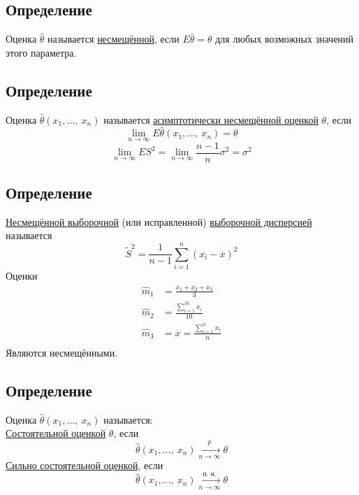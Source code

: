 \documentclass[12pt, a4paper]{article}
\newcommand{\sion}{\sum\limits_{i = 1}^{n}}
\begin{document}
\subsection*{Определение}
Оценка $\hat{\theta}$ называется \underline{несмещённой}, если $E\hat{\theta} = \theta$ для любых возможных значений этого параметра.
\subsection*{Определение}
Оценка $\hat{\theta}(x_1,\dots,\ x_n)$ называется \underline{асимптотически несмещённой оценкой} $\theta$, если
\[\lim_{n\to\infty} E\hat{\theta}(x_1,\dots,\ x_n) = \theta\]
\[\lim_{n\to\infty} ES^2 = \lim_{n\to\infty} \frac{n - 1}{n}\sigma^2 = \sigma^2\]
\subsection*{Определение}
\underline{Несмещённой выборочной} (или исправленной) \underline{выборочной дисперсией} называется
\[\tilde{S}^2 = \frac{1}{n - 1} \sum_{i = 1}^{n} (x_i - \overline{x})^2\]
Оценки
\[\begin{aligned}
    \hat{m}_1 &= \frac{x_1 + x_2 + x_3}{3}\\
    \hat{m}_2 &= \frac{\sum_{i = 1}^{10} x_i}{10}\\
    \hat{m}_3 &= \overline{x} = \frac{\sion x_i}{n}\\  
\end{aligned}\]
Являются несмещёнными.
\subsection*{Определение}
Оценка $\hat{\theta}(x_1,\dots,\ x_n)$ называется:\\
\underline{Состоятельной оценкой} $\theta$, если
\[\hat{\theta} (x_1,\dots,\ x_n) \xrightarrow[n\to\infty]{p} \theta\]
\underline{Сильно состоятельной оценкой}, если
\[\hat{\theta} (x_1,\dots,\ x_n) \xrightarrow[n\to\infty]{\text{п. н.}} \theta\]
\end{document}
